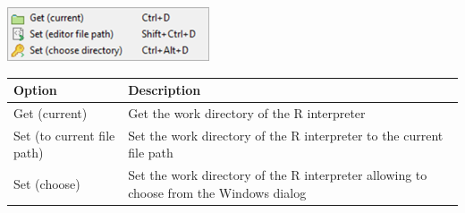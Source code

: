 \includegraphics[scale=0.8]{./res/menu_r_control_workdir.png}\\

\begin{scriptsize}
  \begin{tabularx}{\headwidth}{>{\hsize=0.2\hsize}X>{\hsize=0.7\hsize}X}\\
    \hline
    \textbf{Option} & \textbf{Description} \\
    \hline
    Get (current) & Get the work directory of the R interpreter \\
    Set (to current file path) & Set the work directory of the R interpreter to the current file path \\
    Set (choose) & Set the work directory of the R interpreter allowing to choose from the Windows dialog \\
    \hline
  \end{tabularx}
\end{scriptsize}

